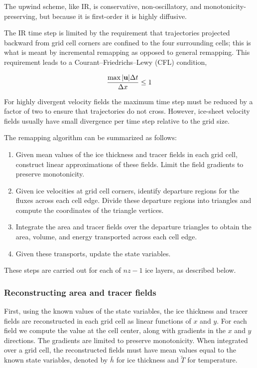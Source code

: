 \noindent
The upwind scheme, like IR, is conservative, non-oscillatory, and
monotonicity-preserving, but because it is first-order it is highly diffusive.

The IR time step is limited by the requirement that trajectories
projected backward from grid cell corners are confined to the four
surrounding cells; this is what is meant by incremental
remapping as opposed to general remapping. This requirement leads to a 
Courant--Friedrichs--Lewy (CFL) condition, 

\begin{equation}
\label{eq:CFL}
  \frac{\max|{\bf u}|\Delta t} {\Delta x} \leq 1 
\end{equation}

\noindent
For highly divergent velocity fields the maximum time
step must be reduced by a factor of two to ensure that
trajectories do not cross.  However, ice-sheet velocity fields
usually have small divergence per time step relative to the grid size.

The remapping algorithm can be summarized as follows:
\begin{enumerate}
\item Given mean values of the ice thickness and tracer fields in each
      grid cell, construct linear approximations of these fields.
      Limit the field gradients to preserve monotonicity.
\item Given ice velocities at grid cell corners, identify departure
      regions for the fluxes across each cell edge.  Divide these
      departure regions into triangles and compute the coordinates
      of the triangle vertices.
\item Integrate the area and tracer fields over the departure triangles to obtain
      the area, volume, and energy transported across each cell edge.
\item Given these transports, update the state variables.
\end{enumerate}
These steps are carried out for each of $nz-1$ ice layers, as described below.

\subsubsection{Reconstructing area and tracer fields}
\label{sc:glissade-IR-reconstruct}

First, using the known values of the state variables, the ice thickness
and tracer fields are reconstructed in each grid cell as linear
functions of $x$ and $y$. For each field we compute the value at
the cell center, along with gradients in the
$x$ and $y$ directions. The gradients are limited to preserve
monotonicity.  When integrated over a grid cell, the reconstructed
fields must have mean values equal to the known state variables,
denoted by $\bar{h}$ for ice thickness and $\tilde{T}$ for temperature.

